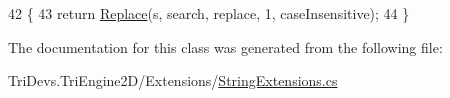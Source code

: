 \begin{DoxyCode}
42         \{
43             \textcolor{keywordflow}{return} \hyperlink{class_tri_devs_1_1_tri_engine2_d_1_1_extensions_1_1_string_extensions_af13fed608d3d1dbd6d9adff7acb177a2}{Replace}(s, search, replace, 1, caseInsensitive);
44         \}
\end{DoxyCode}


The documentation for this class was generated from the following file\-:\begin{DoxyCompactItemize}
\item 
Tri\-Devs.\-Tri\-Engine2\-D/\-Extensions/\hyperlink{_string_extensions_8cs}{String\-Extensions.\-cs}\end{DoxyCompactItemize}
